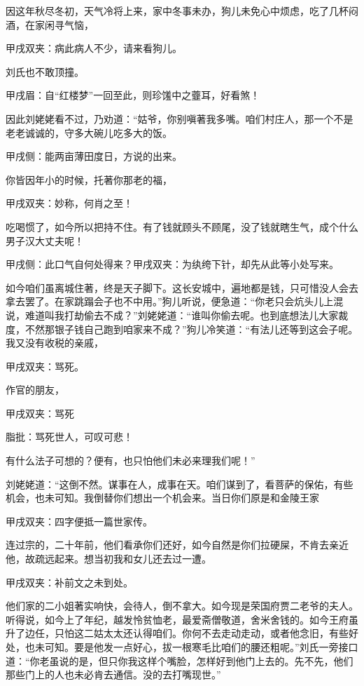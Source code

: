 \begin{parag}
    因这年秋尽冬初，天气冷将上来，家中冬事未办，狗儿未免心中烦虑，吃了几杯闷酒，在家闲寻气恼，\begin{note}甲戌双夹：病此病人不少，请来看狗儿。\end{note}刘氏也不敢顶撞。\begin{note}甲戌眉：自“红楼梦”一回至此，则珍馐中之虀耳，好看煞！\end{note}因此刘姥姥看不过，乃劝道：“姑爷，你别嗔著我多嘴。咱们村庄人，那一个不是老老诚诚的，守多大碗儿吃多大的饭。\begin{note}甲戌侧：能两亩薄田度日，方说的出来。\end{note}你皆因年小的时候，托著你那老的福，\begin{note}甲戌双夹：妙称，何肖之至！\end{note}吃喝惯了，如今所以把持不住。有了钱就顾头不顾尾，没了钱就瞎生气，成个什么男子汉大丈夫呢！\begin{note}甲戌侧：此口气自何处得来？甲戌双夹：为纨绔下针，却先从此等小处写来。\end{note}如今咱们虽离城住著，终是天子脚下。这长安城中，遍地都是钱，只可惜没人会去拿去罢了。在家跳蹋会子也不中用。”狗儿听说，便急道：“你老只会炕头儿上混说，难道叫我打劫偷去不成？”刘姥姥道：“谁叫你偷去呢。也到底想法儿大家裁度，不然那银子钱自己跑到咱家来不成？”狗儿冷笑道：“有法儿还等到这会子呢。我又没有收税的亲戚，\begin{note}甲戌双夹：骂死。\end{note}作官的朋友，\begin{note}甲戌双夹：骂死\end{note}\begin{note}脂批：骂死世人，可叹可悲！\end{note}有什么法子可想的？便有，也只怕他们未必来理我们呢！”
\end{parag}


\begin{parag}
    刘姥姥道：“这倒不然。谋事在人，成事在天。咱们谋到了，看菩萨的保佑，有些机会，也未可知。我倒替你们想出一个机会来。当日你们原是和金陵王家\begin{note}甲戌双夹：四字便抵一篇世家传。\end{note}连过宗的，二十年前，他们看承你们还好，如今自然是你们拉硬屎，不肯去亲近他，故疏远起来。想当初我和女儿还去过一遭。\begin{note}甲戌双夹：补前文之未到处。\end{note}他们家的二小姐著实响快，会待人，倒不拿大。如今现是荣国府贾二老爷的夫人。听得说，如今上了年纪，越发怜贫恤老，最爱斋僧敬道，舍米舍钱的。如今王府虽升了边任，只怕这二姑太太还认得咱们。你何不去走动走动，或者他念旧，有些好处，也未可知。要是他发一点好心，拔一根寒毛比咱们的腰还粗呢。”刘氏一旁接口道：“你老虽说的是，但只你我这样个嘴脸，怎样好到他门上去的。先不先，他们那些门上的人也未必肯去通信。没的去打嘴现世。”
\end{parag}


